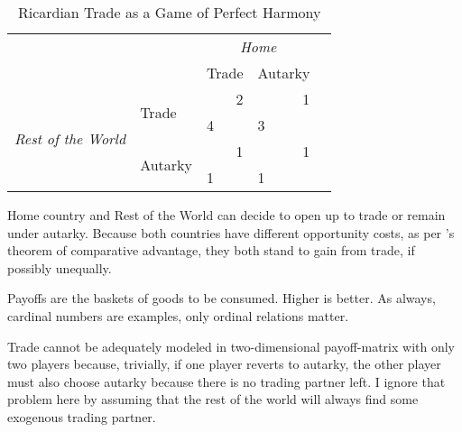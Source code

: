 \begin{table}
	\caption[The Trade Game]{Ricardian Trade as a Game of Perfect Harmony}
	\label{tab:trade}
	\begin{center}
	\begin{tabular}
		{m{1cm}
		m{}
		m{}
		m{}
		m{}}

&
& \multicolumn{2}{c}{\emph{Home}}
\\


&
&Trade
&Autarky
\\

\cline{3-4}

\multicolumn{1}{c}{\multirow{4}{*}{\emph{Rest of the World}}}
& \multirow{2}{2,3cm}{Trade}
& 		\multicolumn{1}{|r|}{2}
& \multicolumn{1}{r|}{1}
\\


\multicolumn{1}{c}{}
& \multicolumn{1}{c}{}
& \multicolumn{1}{|l|}{4}
& \multicolumn{1}{l|}{3}
\\

\cline{3-4}

\multicolumn{1}{c}{}
& \multirow{2}{2,3cm}{Autarky}
& \multicolumn{1}{|r|}{1}
& \multicolumn{1}{r|}{1}
\\


\multicolumn{1}{c}{}
& \multicolumn{1}{c}{}
& \multicolumn{1}{|l|}{1}
& \multicolumn{1}{l|}{1}
\\

\cline{3-4}
\end{tabular}
\end{center}

\scriptsize{
	Home country and Rest of the World can decide to open up to trade or remain under autarky.
	Because both countries have different opportunity costs, as per \citeauthor{Ricardo1817}'s theorem of comparative advantage, they both stand to gain from trade, if possibly unequally.

	Payoffs are the baskets of goods to be consumed.
	Higher is better.
	As always, cardinal numbers are examples, only ordinal relations matter.

	Trade cannot be adequately modeled in two-dimensional payoff-matrix with only two players because, trivially, if one player reverts to autarky, the other player must also choose autarky because there is no trading partner left.
	I ignore that problem here by assuming that the rest of the world will always find some exogenous trading partner.
}
\end{table}

